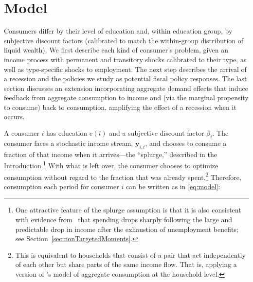 \documentclass[qe,draft]{econsocart}
\theoremstyle{plain}
\theoremstyle{definition}
\begin{document}

\section{Model}\label{model}
\label{sec:model} %

Consumers differ by their level of education and, within education group, by subjective discount factors (calibrated to match the within-group distribution of liquid wealth). We first describe each kind of consumer's problem, given an income process with permanent and transitory shocks calibrated to their type, as well as type-specific shocks to employment. The next step describes the arrival of a recession and the policies we study as potential fiscal policy responses. The last section discusses an extension incorporating aggregate demand effects that induce feedback from aggregate consumption to income and (via the marginal propensity to consume) back to consumption, amplifying the effect of a recession when it occurs.

A consumer $i$ has education $e(i)$ and a subjective discount factor $\beta_i$. The consumer faces a stochastic income stream, $\mathbf{y}_{i,t}$, and chooses to consume a fraction of that income when it arrives---the ``splurge,'' described in the Introduction.\footnote{One attractive feature of the splurge assumption is that it is also consistent with evidence from~\cite{ganongConsumer2019} that spending drops sharply following the large and predictable drop in income after the exhaustion of unemployment benefits; see Section~\ref{sec:nonTargetedMoments}.} With what is left over, the consumer chooses to optimize consumption without regard to the fraction that was already spent.\footnote{This is equivalent to households that consist of a pair that act independently of each other but share parts of the same income flow. That is, applying a version of \citet{campbell1989consumption}'s model of aggregate consumption at the household level.} Therefore, consumption each period for consumer $i$ can be written as in \eqref{eq:model}:
\end{document}
